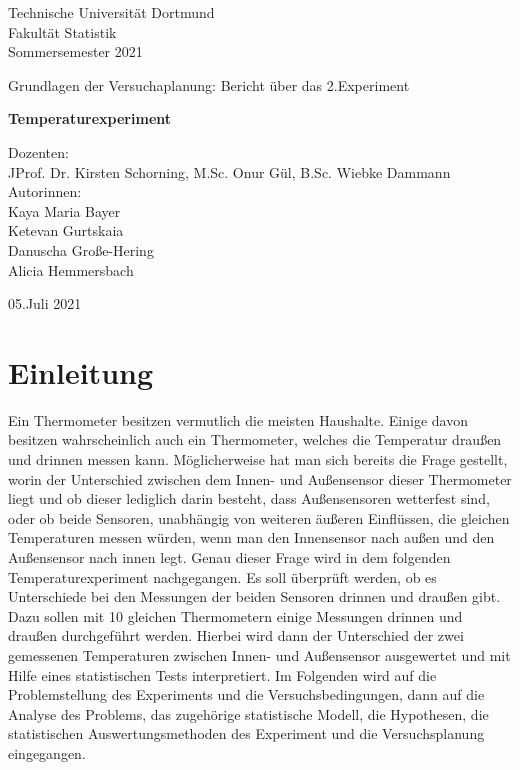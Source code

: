 \documentclass[ ngerman, fontsize= 12pt, paper=a4, headings=big, titlepage=true]{article}
\begin{document}
	
	
	\begin{center}
		\Large
		Technische Universität Dortmund\\
		Fakultät Statistik\\
		Sommersemester 2021\\
		
		\vspace{4em}
		
		Grundlagen der Versuchaplanung: Bericht über das 2.Experiment
		
		\Huge
		\textbf{Temperaturexperiment}
		
		\Large
		\vspace{5em}
		Dozenten:\\
		JProf. Dr. Kirsten Schorning, M.Sc. Onur Gül, B.Sc. Wiebke Dammann\\
		
		
		\vspace{8em}
		Autorinnen: \\
		Kaya Maria Bayer\\
		Ketevan Gurtskaia\\
		Danuscha Große-Hering\\	
		Alicia Hemmersbach\\
		
		
		
		\vspace{12em}
		
		05.Juli 2021
		
	\end{center}
	
	\newpage	
	
	\tableofcontents
	\newpage
	
	\section{Einleitung}
	Ein Thermometer besitzen vermutlich die meisten Haushalte. Einige davon besitzen wahrscheinlich auch ein Thermometer, welches die Temperatur draußen und drinnen messen kann. Möglicherweise hat man sich bereits die Frage gestellt, worin der Unterschied zwischen dem Innen- und Außensensor dieser Thermometer liegt und ob dieser lediglich darin besteht, dass Außensensoren wetterfest sind, oder ob beide Sensoren, unabhängig von weiteren äußeren Einflüssen, die gleichen Temperaturen messen würden, wenn man den Innensensor nach außen und den Außensensor nach innen legt. \newline 
	Genau dieser Frage wird in dem folgenden Temperaturexperiment nachgegangen. Es soll überprüft werden, ob es Unterschiede bei den Messungen der beiden Sensoren drinnen und draußen gibt. \newline
	Dazu sollen mit 10 gleichen Thermometern einige Messungen drinnen und draußen durchgeführt werden. Hierbei wird dann der Unterschied der zwei gemessenen Temperaturen zwischen Innen- und Außensensor ausgewertet und mit Hilfe eines statistischen Tests interpretiert. \newline 
	Im Folgenden wird auf die Problemstellung des Experiments und die Versuchsbedingungen, dann auf die Analyse des Problems, das zugehörige statistische Modell, die Hypothesen, die statistischen Auswertungsmethoden des Experiment und die Versuchsplanung eingegangen.
\end{document}
